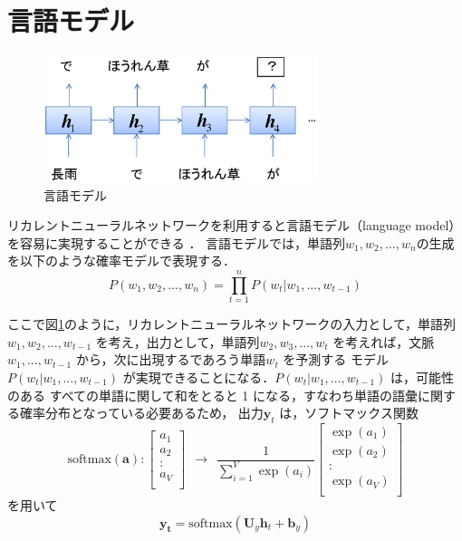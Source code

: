 \section{言語モデル}

\begin{figure}[t]
 \begin{center}
  \includegraphics[width=80mm]{images/TsuruokaLab/lm.eps}
 \end{center}
 \caption{言語モデル}
 \label{fig:lm}
\end{figure}

リカレントニューラルネットワークを利用すると言語モデル（language model）を容易に実現することができる \cite{mikolov10lm}．
言語モデルでは，単語列$w_1,w_2,...,w_n$の生成を以下のような確率モデルで表現する．
\begin{equation}
P(w_1,w_2,...,w_n) = \prod_{t=1}^n P(w_t | w_1,...,w_{t-1})
\end{equation}

ここで図\ref{fig:lm}のように，リカレントニューラルネットワークの入力として，単語列$w_1,w_2,...,w_{t-1}$ 
を考え，出力として，単語列$w_2,w_3,...,w_{t}$
を考えれば，文脈$w_1,...,w_{t-1}$ から，次に出現するであろう単語$w_t$ を予測する
モデル $P(w_t | w_1,...,w_{t-1})$ が実現できることになる．$P(w_t | w_1,...,w_{t-1})$ は，可能性のある
すべての単語に関して和をとると 1 になる，すなわち単語の語彙に関する確率分布となっている必要あるため，
出力$\boldsymbol{y}_t$ は，ソフトマックス関数
\begin{equation}
\mbox{softmax}(\boldsymbol{a}): 
 \begin{bmatrix}
   a_1 \\
   a_2 \\
    : \\
   a_V \\
 \end{bmatrix}
~~\rightarrow~~
\frac{1}{\sum_{i=1}^V \exp(a_i)}
 \begin{bmatrix}
   \exp(a_1) \\
   \exp(a_2) \\
    : \\
   \exp(a_V) \\
\end{bmatrix}
\end{equation}
\noindent
を用いて
\begin{equation}
\boldsymbol{y_t} = \mbox{softmax}(\boldsymbol{U}_y \boldsymbol{h}_{t} + \boldsymbol{b}_y)
\end{equation}

